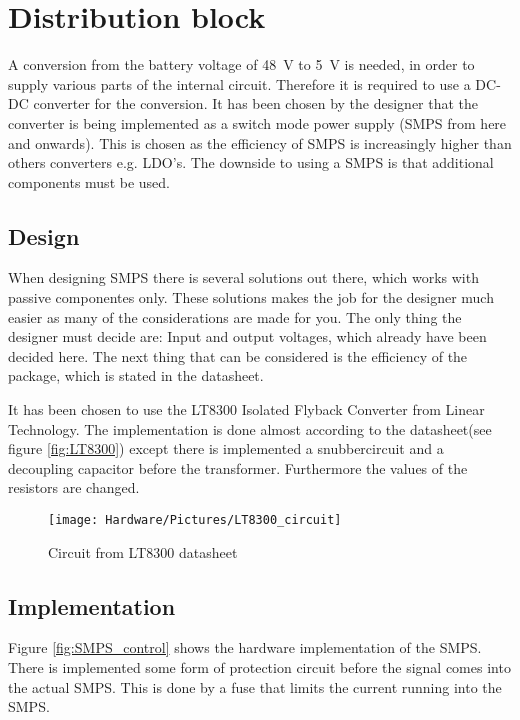 \newpage
\section{Distribution block}
\label{sec:SMPS}
A conversion from the battery voltage of \SI{48}{\volt} to \SI{5}{\volt} is needed, in order to supply various parts of the internal circuit. Therefore it is required to use a DC-DC converter for the conversion. It has been chosen by the designer that the converter is being implemented as a switch mode power supply (SMPS from here and onwards). This is chosen as the efficiency of SMPS is increasingly higher than others converters e.g. LDO's. The downside to using a SMPS is that additional components must be used.  

\subsection{Design}
When designing SMPS there is several solutions out there, which works with passive componentes only. These solutions makes the job for the designer much easier as many of the considerations are made for you. The only thing the designer must decide are: Input and output voltages, which already have been decided here. The next thing that can be considered is the efficiency of the package, which is stated in the datasheet.

It has been chosen to use the LT8300 Isolated Flyback Converter from Linear Technology. The implementation is done almost according to the datasheet(see figure \vref{fig:LT8300}) \cite{LT8300} except there is implemented a snubbercircuit and a decoupling capacitor before the transformer. Furthermore the values of the resistors are changed.  \\

\begin{figure}[H]
	\centering
	\texttt{[image: Hardware/Pictures/LT8300\_circuit]}
	\caption{Circuit from LT8300 datasheet}
	\label{fig:LT8300}
\end{figure}

\subsection{Implementation}

Figure \vref{fig:SMPS_control} shows the hardware implementation of the SMPS. There is implemented some form of protection circuit before the signal comes into the actual SMPS. This is done by a fuse that limits the current running into the SMPS. 

